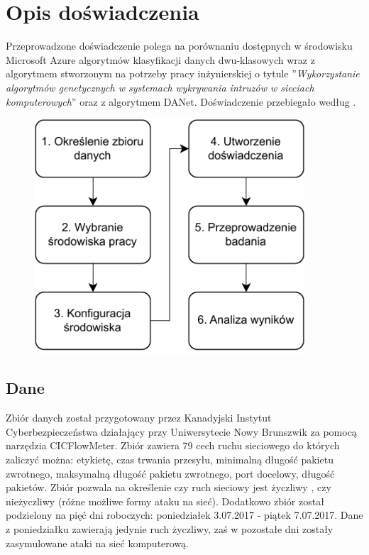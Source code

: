 \chapter{Opis doświadczenia}
\label{cha:dos}
Przeprowadzone doświadczenie polega na porównaniu dostępnych w środowisku Microsoft Azure algorytmów klasyfikacji danych dwu-klasowych wraz z algorytmem stworzonym na potrzeby pracy inżynierskiej o tytule ''\textit{Wykorzystanie algorytmów genetycznych w systemach wykrywania intruzów w sieciach komputerowych}''\cite{Blyszcz2022} oraz z algorytmem DANet\cite{Chen2022}. Doświadczenie przebiegało według .

\begin{figure}[H]
    \centering
    \includegraphics[width=0.9\textwidth]{images/schemat_pracy}
    \label{fig:sch-prac}
\end{figure}

\section{Dane}
Zbiór danych został przygotowany przez Kanadyjski Instytut Cyberbezpieczeństwa działający przy Uniwersytecie Nowy Brunszwik za pomocą narzędzia CICFlowMeter\cite{Ahlashkari2022}. Zbiór zawiera 79 cech ruchu sieciowego do których zaliczyć można: etykietę, czas trwania przesyłu, minimalną długość pakietu zwrotnego, maksymalną długość pakietu zwrotnego, port docelowy, długość pakietów. Zbiór pozwala na określenie czy ruch sieciowy jest życzliwy , czy nieżyczliwy (różne możliwe formy ataku na sieć). Dodatkowo zbiór został podzielony na pięć dni roboczych: poniedziałek 3.07.2017 - piątek 7.07.2017. Dane z poniedziałku zawierają jedynie ruch życzliwy, zaś w pozostałe dni zostały zasymulowane ataki na sieć komputerową\cite{Blyszcz2022, unbkaggle}.

